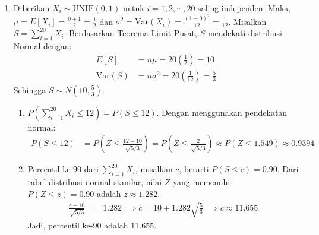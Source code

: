 \documentclass[11pt,letterpaper]{article}
\begin{document}
\begin{enumerate}
  \item
        Diberikan $X_i \sim \text{UNIF}(0, 1)$ untuk $i = 1, 2, \cdots, 20$ saling independen.
        Maka, $\mu = E[X_i] = \frac{0+1}{2} = \frac{1}{2}$ dan $\sigma^2 = \text{Var}(X_i) = \frac{(1-0)^2}{12} = \frac{1}{12}$.
        Misalkan $S = \sum_{i=1}^{20} X_i$. Berdasarkan Teorema Limit Pusat, $S$ mendekati distribusi Normal dengan:
        \begin{align*}
          E[S]          & = n\mu = 20 \left(\frac{1}{2}\right) = 10                \\
          \text{Var}(S) & = n\sigma^2 = 20 \left(\frac{1}{12}\right) = \frac{5}{3}
        \end{align*}
        Sehingga $S \sim N\left(10, \frac{5}{3}\right)$.
        \begin{enumerate}[label=(\alph*)]
          \item $P\left( \sum_{i=1}^{20} X_i \le 12 \right) = P(S \le 12)$.
                Dengan menggunakan pendekatan normal:
                \begin{align*}
                  P(S \le 12) & = P\left(Z \le \frac{12 - 10}{\sqrt{5/3}}\right) = P\left(Z \le \frac{2}{\sqrt{5/3}}\right)  \approx P(Z \le 1.549) \approx 0.9394
                \end{align*}

          \item Percentil ke-90 dari $\sum_{i=1}^{20} X_i$, misalkan $c$, berarti $P(S \le c) = 0.90$.
                Dari tabel distribusi normal standar, nilai $Z$ yang memenuhi $P(Z \le z) = 0.90$ adalah $z \approx 1.282$.
                \begin{align*}
                  \frac{c - 10}{\sqrt{5/3}} & = 1.282                   \implies
                  c                          = 10 + 1.282 \sqrt{\frac{5}{3}} \implies
                  c                         \approx 11.655
                \end{align*}
                Jadi, percentil ke-90 adalah 11.655.
        \end{enumerate}


\end{enumerate}
\end{document}
